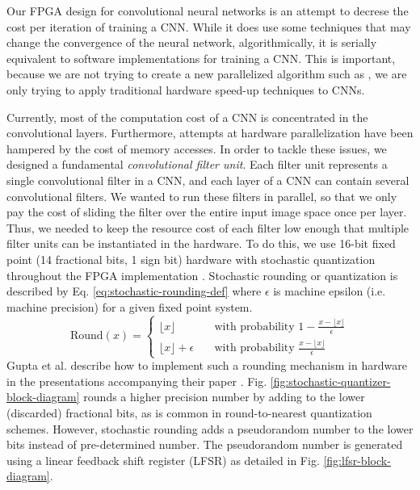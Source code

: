 Our FPGA design for convolutional neural networks is an attempt to decrese the cost per iteration of training a CNN. While it does use some techniques that may change the convergence of the neural network, algorithmically, it is serially equivalent to software implementations for training a CNN. This is important, because we are not trying to create a new parallelized algorithm such as {}, we are only trying to apply traditional hardware speed-up techniques to CNNs.

Currently, most of the computation cost of a CNN is concentrated in the convolutional layers. Furthermore, attempts at hardware parallelization have been hampered by the cost of memory accesses. In order to tackle these issues, we designed a fundamental \textit{convolutional filter unit}. Each filter unit represents a single convolutional filter in a CNN, and each layer of a CNN can contain several convolutional filters. We wanted to run these filters in parallel, so that we only pay the cost of sliding the filter over the entire input image space once per layer. Thus, we needed to keep the resource cost of each filter low enough that multiple filter units can be instantiated in the hardware. To do this, we use 16-bit fixed point (14 fractional bits, 1 sign bit) hardware with stochastic quantization throughout the FPGA implementation \cite{limited-precision}. Stochastic rounding or quantization is described by Eq. \ref{eq:stochastic-rounding-def} where $\epsilon$ is machine epsilon (i.e. machine precision) for a given fixed point system.
\begin{equation}
	\mathrm{Round}(x) = \begin{cases}
		\lfloor x \rfloor & \quad \text{with probability } 1 - \frac{x - \lfloor x \rfloor}{\epsilon} \\
		\lfloor x \rfloor + \epsilon & \quad \text{with probability } \frac{x - \lfloor x \rfloor}{\epsilon}
	\end{cases}
	\label{eq:stochastic-rounding-def}
\end{equation}
Gupta et al. describe how to implement such a rounding mechanism in hardware in the presentations accompanying their paper \cite{limited-precision}. Fig. \ref{fig:stochastic-quantizer-block-diagram} rounds a higher precision number by adding to the lower (discarded) fractional bits, as is common in round-to-nearest quantization schemes. However, stochastic rounding adds a pseudorandom number to the lower bits instead of pre-determined number. The pseudorandom number is generated using a linear feedback shift register (LFSR) as detailed in Fig. \ref{fig:lfsr-block-diagram}.
